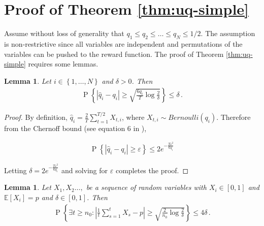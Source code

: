 \documentclass{article}
\newif\ifsup\suptrue
\newcommand{\set}[1]{\left\{#1\right\}}
\newcommand{\eq}[1]{\begin{align*}#1\end{align*}}
\renewcommand{\P}[1]{\operatorname{P}\left\{#1\right\}}
\newcommand{\EE}{\mathbb E}
\theoremstyle{plain}
\newtheorem{lemma}[theorem]{Lemma}
\theoremstyle{definition}
\let\epsilon\varepsilon
\begin{document}




{\small}


\ifsup


\section{Proof of Theorem \ref{thm:uq-simple}}\label{sec:thm:uq-simple}


Assume without loss of generality that $q_1 \leq q_2 \leq \ldots \leq q_N \leq 1/2$. The assumption is non-restrictive since all variables
are independent and permutations of the variables can be pushed to the reward function.
The proof of Theorem \ref{thm:uq-simple} requires some lemmas. \

\begin{lemma}\label{lem:conc1}
Let $i \in \set{1,\ldots, N}$ and $\delta > 0$. Then
\eq{
\P{\left|\hat q_i - q_i\right| \geq \sqrt{\frac{6q_i}{T} \log \frac{2}{\delta}}} \leq \delta\,.
}
\end{lemma}

\begin{proof}
By definition, $\hat{q}_i = \frac{2}{T}\sum_{t=1}^{T/2}X_{t,i}$, where $X_{t,i} \sim Bernoulli(q_i)$. Therefore from the Chernoff bound (see equation 6 in \cite{hagerup1990guided}),

\eq{
\P{\left|\hat q_i - q_i\right| \geq \epsilon} \leq 2e^{-\frac{T\epsilon^2}{6q_i}}
}

Letting $\delta = 2e^{-\frac{T\epsilon^2}{6q_i}}$ and solving for $\epsilon$ completes the proof.

\end{proof}

\begin{lemma}\label{lem:conc2}
Let $X_1,X_2\ldots,$ be a sequence of random variables with $X_i \in [0,1]$ and $\EE[X_i] = p$ and $\delta \in [0,1]$.
Then 
\eq{
\P{\exists t \geq n_0 : \left|\frac{1}{t} \sum_{s=1}^t X_s - p\right| \geq \sqrt{\frac{2}{n_0} \log \frac{2}{\delta}}} \leq 4\delta\,.
}
\end{lemma}
\end{document}
